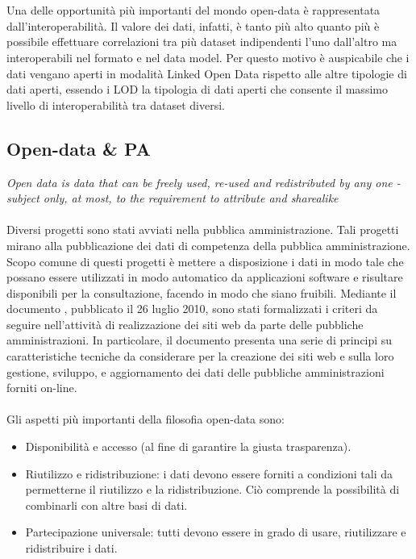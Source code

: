 \documentclass{article}
\theoremstyle{plain}
\theoremstyle{definition}
\begin{document}
\\
\\
Una delle opportunità più importanti del mondo open-data è rappresentata dall'interoperabilità. Il valore dei dati, infatti, è tanto più alto quanto più è possibile effettuare correlazioni tra più dataset indipendenti l'uno dall'altro ma interoperabili nel formato e nel data model. Per questo motivo è auspicabile che i dati vengano aperti in modalità Linked Open Data rispetto alle altre tipologie di dati aperti, essendo i LOD la tipologia di dati aperti che consente il massimo livello di interoperabilità tra dataset diversi. \footnotemark{}

\subsection{Open-data \& PA}
\textit{Open data is data that can be freely used, re-used and redistributed by any one - subject only, at most, to the requirement to attribute and sharealike}
\footnotemark
{}
\\
\\
Diversi progetti sono stati avviati nella pubblica amministrazione. Tali progetti mirano alla pubblicazione dei dati di competenza della pubblica amministrazione. Scopo comune di questi progetti è mettere a disposizione i dati in modo tale che possano essere utilizzati in modo automatico da applicazioni software e risultare disponibili per la consultazione, facendo in modo che siano fruibili. Mediante il documento \footnotemark
{}, pubblicato il 26 luglio 2010, sono stati formalizzati i criteri da seguire nell'attività di realizzazione dei siti web da parte delle pubbliche amministrazioni. In particolare, il documento presenta una serie di principi su caratteristiche tecniche da considerare per la creazione dei siti web e sulla loro gestione, sviluppo, e aggiornamento dei dati delle pubbliche amministrazioni forniti on-line. 
\\
\\
Gli aspetti più importanti della filosofia open-data sono:
\begin{itemize}
\item Disponibilità e accesso (al fine di garantire la giusta trasparenza).
\item Riutilizzo e ridistribuzione: i dati devono essere forniti a condizioni tali da permetterne il riutilizzo e la ridistribuzione. Ciò comprende la possibilità di combinarli con altre basi di dati.
\item Partecipazione universale: tutti devono essere in grado di usare, riutilizzare e ridistribuire i dati.
\end{itemize}
\end{document}
